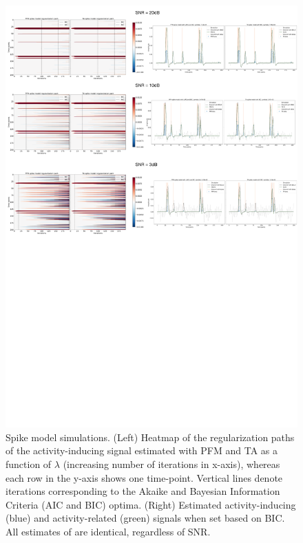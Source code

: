 \begin{figure}[t!]
    \begin{center}
        \includegraphics[width=\textwidth]{figures/regpath_spike.pdf}
    \end{center}
    \caption{Spike model simulations. (Left) Heatmap of the regularization paths of the activity-inducing signal estimated with PFM and TA as a function of \(\lambda\) (increasing number of iterations in x-axis), whereas each row in the y-axis shows one time-point. Vertical lines denote iterations corresponding to the Akaike and Bayesian Information Criteria (AIC and BIC) optima. (Right) Estimated activity-inducing (blue) and activity-related (green) signals when set based on BIC. All estimates of are identical, regardless of SNR.}
\label{fig:path_spike}
\end{figure}

